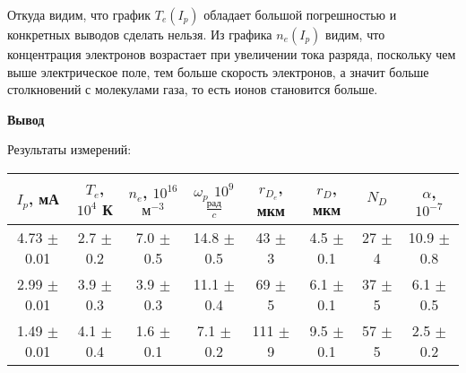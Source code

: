 \documentclass[a4paper,12pt]{article}
\begin{document}
Откуда видим, что график $T_e(I_p)$ обладает большой погрешностью и конкретных выводов сделать нельзя. Из графика $n_e(I_p)$ видим, что концентрация электронов возрастает при увеличении тока разряда, поскольку чем выше электрическое поле, тем больше скорость электронов, а значит больше столкновений с молекулами газа, то есть ионов становится больше. 

\par\textbf{Вывод}

Результаты измерений:

\begin{center}
\begin{tabular}{|c|c|c|c|c|c|c|c|}
	\hline
	$I_p$, мА & $T_e$, $10^4$ К & $n_e$, $10^{16}$ ${\text{м}}^{-3}$ & ${\omega}_p$ $10^9$ $\frac{\text{рад}}{c}$ & $r_{D_e}$, мкм & $r_D$, мкм & $N_D$ & $\alpha$, $10^{-7}$ \\
	\hline
    4.73 $\pm$ 0.01 & 2.7 $\pm$ 0.2 & 7.0 $\pm$ 0.5 & 14.8 $\pm$ 0.5 & 43 $\pm$ 3 & 4.5 $\pm$ 0.1 & 27 $\pm$ 4 & 10.9 $\pm$ 0.8\\
    \hline
    2.99 $\pm$ 0.01 & 3.9 $\pm$ 0.3 & 3.9 $\pm$ 0.3 & 11.1 $\pm$ 0.4 & 69 $\pm$ 5 & 6.1 $\pm$ 0.1 & 37 $\pm$ 5 & 6.1 $\pm$ 0.5\\
    \hline
    1.49 $\pm$ 0.01 & 4.1 $\pm$ 0.4 & 1.6 $\pm$ 0.1 & 7.1 $\pm$ 0.2 & 111 $\pm$ 9 & 9.5 $\pm$ 0.1 & 57 $\pm$ 5 & 2.5 $\pm$ 0.2\\
	\hline
\end{tabular}
\end{center}
\end{document}

